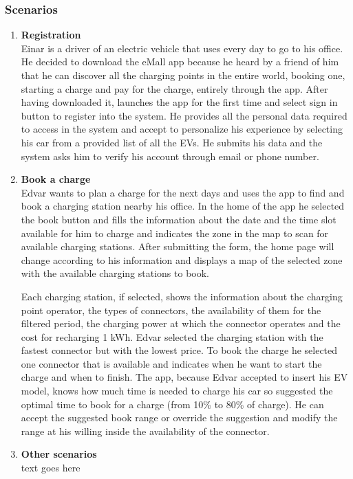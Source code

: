 \subsubsection{Scenarios}
\begin{enumerate}[label=\textbf{\Alph*}.]
    \item \textbf{Registration} \\
          Einar is a driver of an electric vehicle that uses every day to go to his
          office. He decided to download the eMall app because he heard by a friend
          of him that he can discover all the charging points in the entire world,
          booking one, starting a charge and pay for the charge, entirely through
          the app. After having downloaded it, launches the app for the first time
          and select sign in button to register into the system. He provides all
          the personal data required to access in the system and accept to personalize
          his experience by selecting his car from a provided list of all the EVs.
          He submits his data and the system asks him to verify his account through email or phone number.
    \item \textbf{Book a charge} \\
          Edvar wants to plan a charge for the next days and uses the app to find and book a charging
          station nearby his office. In the home of the app he selected the book button and fills the
          information about the date and the time slot available for him to charge and indicates the
          zone in the map to scan for available charging stations. After submitting the form, the home page
          will change according to his information and displays a map of the selected zone with the available
          charging stations to book.

          Each charging station, if selected, shows the information about the charging point operator,
          the types of connectors, the availability of them for the filtered period,
          the charging power at which the connector operates and the cost for recharging 1 kWh.
          Edvar selected the charging station with the fastest connector but with the lowest price.
          To book the charge he selected one connector that is available and indicates when he want to start the charge
          and when to finish.
          The app, because Edvar accepted to insert his EV model, knows how much time is needed to charge his car so suggested
          the optimal time to book for a charge (from 10\% to 80\% of charge).
          He can accept the suggested book range or override the suggestion and modify the range at his willing inside the
          availability of the connector.
    \item \textbf{Other scenarios} \\
          text goes here
\end{enumerate}

